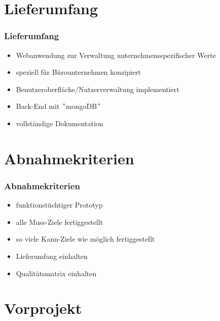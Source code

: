 \documentclass{beamer}
\begin{document}
\section{Lieferumfang}

\begin{frame}
\frametitle{Lieferumfang}
\begin{block}{}
\begin{itemize}
\item Webanwendung zur Verwaltung unternehmensspezifischer Werte
\item speziell für Bürounternehmen konzipiert
\item Benutzeroberfläche/Nutzerverwaltung implementiert
\item Back-End mit $"$mongoDB$"$
\item vollständige Dokumentation
\end{itemize}
\end{block}
\end{frame}

\section{Abnahmekriterien}

\begin{frame}
\frametitle{Abnahmekriterien}
\begin{block}{}
\begin{itemize}
\item funktionstüchtiger Prototyp
\item alle Muss-Ziele fertiggestellt
\item so viele Kann-Ziele wie möglich fertiggestellt
\item Lieferumfang einhalten
\item Qualitätsmatrix einhalten
\end{itemize}
\end{block}
\end{frame}

\section{Vorprojekt}
\end{document}
